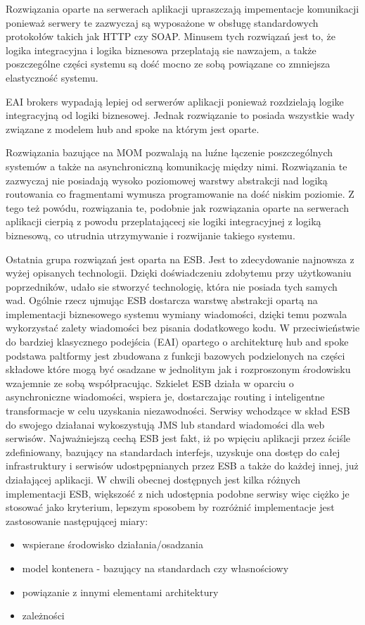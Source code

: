 Rozwiązania oparte na serwerach aplikacji upraszczają impementacje komunikacji ponieważ serwery te zazwyczaj są wyposażone w obsługę standardowych protokołów takich jak HTTP czy SOAP. Minusem tych rozwiązań jest to, że logika integracyjna i logika biznesowa przeplatają sie nawzajem, a także poszczególne części systemu są dość mocno ze sobą powiązane co zmniejsza elastyczność systemu.

EAI brokers wypadają lepiej od serwerów aplikacji ponieważ rozdzielają logike integracyjną od logiki biznesowej. Jednak rozwiązanie to posiada wszystkie wady związane z modelem hub and spoke na którym jest oparte.

Rozwiązania bazujące na MOM pozwalają na luźne łączenie poszczególnych systemów a także na asynchroniczną komunikację między nimi. Rozwiązania te zazwyczaj nie posiadają wysoko poziomowej warstwy abstrakcji nad logiką routowania co fragmentami wymusza programowanie na dość niskim poziomie. Z tego też powódu, rozwiązania te, podobnie jak rozwiązania oparte na serwerach aplikacji cierpią z powodu przeplatającecj sie logiki integracyjnej z logiką biznesową, co utrudnia utrzymywanie i rozwijanie takiego systemu.

Ostatnia grupa rozwiązań jest oparta na ESB. Jest to zdecydowanie najnowsza z wyżej opisanych technologii. Dzięki doświadczeniu zdobytemu przy użytkowaniu poprzedników, udało sie stworzyć technologię, która nie posiada tych samych wad. Ogólnie rzecz ujmując ESB dostarcza warstwę abstrakcji opartą na implementacji biznesowego systemu wymiany wiadomości, dzięki temu pozwala wykorzystać zalety wiadomości bez pisania dodatkowego kodu. W przeciwieństwie do bardziej klasycznego podejścia (EAI) opartego o architekturę hub and spoke podstawa paltformy jest zbudowana z funkcji bazowych podzielonych na części składowe które mogą być osadzane w jednolitym jak i rozproszonym środowisku wzajemnie ze sobą współpracując. Szkielet ESB działa w oparciu o asynchroniczne wiadomości, wspiera je, dostarczając routing i inteligentne transformacje w celu uzyskania niezawodności. Serwisy wchodzące w skład ESB do swojego działanai wykoszystują JMS lub standard wiadomości dla web serwisów. Najważniejszą cechą ESB jest fakt, iż po wpięciu aplikacji przez ściśle zdefiniowany, bazujący na standardach interfejs, uzyskuje ona dostęp do całej infrastruktury i serwisów udostpępnianych przez ESB a także do każdej innej, już działającej aplikacji. W chwili obecnej dostępnych jest kilka różnych implementacji ESB, większość z nich udostępnia podobne serwisy więc ciężko je stosować jako kryterium, lepszym sposobem by rozróżnić implementacje jest zastosowanie następującej miary:
\begin{itemize}
	\item wspierane środowisko działania/osadzania
	\item model kontenera - bazujący na standardach czy własnościowy
	\item powiązanie z innymi elementami architektury
	\item zależności
\end{itemize}

